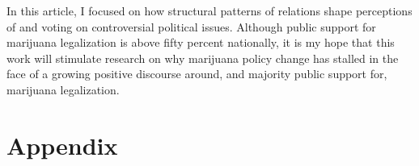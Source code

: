In this article, I focused on how structural patterns of relations shape perceptions of and voting on controversial political issues. Although public  support for marijuana legalization is above fifty percent nationally, it is my hope that this work will stimulate research on why marijuana policy change has stalled in the face of a growing positive discourse around, and majority public support for, marijuana legalization.


\newpage

%
%



\section{Appendix}
\begin{singlespace}
{\renewcommand\normalsize{\tiny}%
\normalsize
{}}
\end{singlespace}

